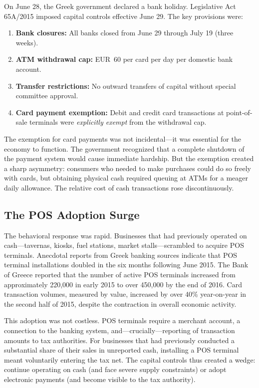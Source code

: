 \documentclass[12pt]{article}
\begin{document}
On June 28, the Greek government declared a bank holiday. Legislative Act 65A/2015 imposed capital controls effective June 29. The key provisions were:

\begin{enumerate}
    \item \textbf{Bank closures:} All banks closed from June 29 through July 19 (three weeks).
    \item \textbf{ATM withdrawal cap:} EUR~60 per card per day per domestic bank account.
    \item \textbf{Transfer restrictions:} No outward transfers of capital without special committee approval.
    \item \textbf{Card payment exemption:} Debit and credit card transactions at point-of-sale terminals were \emph{explicitly exempt} from the withdrawal cap.
\end{enumerate}

The exemption for card payments was not incidental---it was essential for the economy to function. The government recognized that a complete shutdown of the payment system would cause immediate hardship. But the exemption created a sharp asymmetry: consumers who needed to make purchases could do so freely with cards, but obtaining physical cash required queuing at ATMs for a meager daily allowance. The relative cost of cash transactions rose discontinuously.

\subsection{The POS Adoption Surge}

The behavioral response was rapid. Businesses that had previously operated on cash---tavernas, kiosks, fuel stations, market stalls---scrambled to acquire POS terminals. Anecdotal reports from Greek banking sources indicate that POS terminal installations doubled in the six months following June 2015. The Bank of Greece reported that the number of active POS terminals increased from approximately 220,000 in early 2015 to over 450,000 by the end of 2016. Card transaction volumes, measured by value, increased by over 40\% year-on-year in the second half of 2015, despite the contraction in overall economic activity.

This adoption was not costless. POS terminals require a merchant account, a connection to the banking system, and---crucially---reporting of transaction amounts to tax authorities. For businesses that had previously conducted a substantial share of their sales in unreported cash, installing a POS terminal meant voluntarily entering the tax net. The capital controls thus created a wedge: continue operating on cash (and face severe supply constraints) or adopt electronic payments (and become visible to the tax authority).
\end{document}
